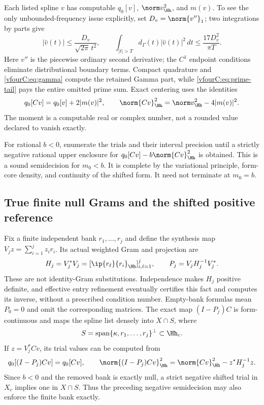 Each listed spline $v$ has computable $q_0[v]$, $\norm v_{\Hh}^2$, and $m(v)$.
To see the only unbounded-frequency issue explicitly, set $D_v=\norm{v''}_1$;
two integrations by parts give
\[
 |\widehat v(t)|\le\frac{D_v}{\sqrt{2\pi}\,t^2},\qquad
 \int_{|t|>T}d_\Gamma(t)|\widehat v(t)|^2\,dt
       \le\frac{17D_v^2}{\pi T}.
\]
Here $v''$ is the piecewise ordinary second derivative; the $C^1$ endpoint
conditions eliminate distributional boundary terms.  Compact quadrature and
\eqref{vfourC:eq:gamma} compute the retained Gamma part, while
\eqref{vfourC:eq:prime-tail} pays the entire omitted prime sum.  Exact centering
uses the identities
\begin{equation}\label{vfourC:eq:centering}
 q_0[Cv]=q_0[v]+2|m(v)|^2,\qquad
 \norm{Cv}_{\Hh}^2=\norm v_{\Hh}^2-4|m(v)|^2.
\end{equation}
The moment is a computable real or complex number, not a rounded value declared
to vanish exactly.

For rational $b<0$, enumerate the trials and their interval precision until a
strictly negative rational upper enclosure for
$q_0[Cv]-b\norm{Cv}_{\Hh}^2$ is obtained.  This is a sound semidecision for
$m_0<b$.  It is complete by the variational principle, form-core density, and
continuity of the shifted form.  It need not terminate at $m_0=b$.

\subsection{True finite null Grams and the shifted positive reference}
\label{vfourC:subsec:reference}

Fix a finite independent bank $r_1,\ldots,r_j$ and define the synthesis map
$V_jz=\sum_{i=1}^jz_i r_i$.  Its actual weighted Gram and projection are
\begin{equation}\label{vfourC:eq:null-gram}
 H_j=V_j^*V_j
       =[\ip{r_\ell}{r_i}_{\Hh}]_{i,\ell=1}^j,
 \qquad P_j=V_jH_j^{-1}V_j^*.
\end{equation}
These are not identity-Gram substitutions.  Independence makes $H_j$ positive
definite, and effective entry refinement eventually certifies this fact and
computes its inverse, without a prescribed condition number.  Empty-bank
formulas mean $P_0=0$ and omit the corresponding matrices.  The exact map
$(I-P_j)C$ is form-continuous and maps the spline list densely into
$X\cap S$, where
\[
 S=\operatorname{span}\{\kappa,r_1,\ldots,r_j\}^{\perp}\subset\Hh_c.
\]
If $z=V_j^*Cv$, its trial values can be computed from
\[
 q_0[(I-P_j)Cv]=q_0[Cv],\qquad
 \norm{(I-P_j)Cv}_{\Hh}^2=\norm{Cv}_{\Hh}^2-z^*H_j^{-1}z.
\]
Since $b<0$ and the removed bank is exactly null, a strict negative shifted
trial in $X_c$ implies one in $X\cap S$.  Thus the preceding negative
semidecision may also enforce the finite bank exactly.

